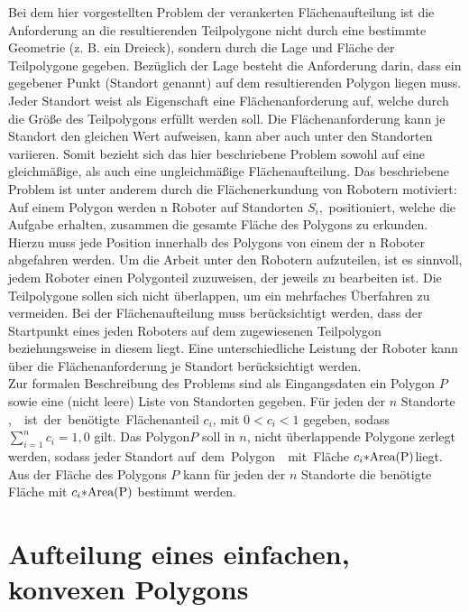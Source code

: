 \documentclass[ngerman]{seminarbeitrag}
\begin{document}
Bei dem hier vorgestellten Problem der verankerten Flächenaufteilung ist die Anforderung an die resultierenden Teilpolygone nicht durch eine bestimmte Geometrie
(z. B. ein Dreieck), sondern durch die Lage und Fläche der Teilpolygone gegeben. Bezüglich der Lage besteht die Anforderung darin, dass ein gegebener Punkt (Standort genannt) auf
dem resultierenden Polygon liegen muss. Jeder Standort weist als Eigenschaft eine Flächenanforderung auf, welche durch die Größe des Teilpolygons erfüllt werden soll. Die
Flächenanforderung kann je Standort den gleichen Wert aufweisen, kann aber auch unter den Standorten variieren. Somit bezieht sich das hier beschriebene Problem sowohl auf eine
gleichmäßige, als auch eine ungleichmäßige Flächenaufteilung. Das beschriebene Problem ist unter anderem durch die Flächenerkundung von Robotern motiviert: \\

Auf einem Polygon werden n Roboter auf Standorten $S_{i},$ \iton positioniert, welche die Aufgabe erhalten, zusammen die gesamte Fläche des Polygons zu
erkunden. Hierzu muss jede Position innerhalb des Polygons von einem der n Roboter abgefahren werden. Um die Arbeit unter den Robotern aufzuteilen, ist es sinnvoll, jedem Roboter einen
Polygonteil zuzuweisen, der jeweils zu bearbeiten ist. Die Teilpolygone sollen sich nicht überlappen, um ein mehrfaches Überfahren zu vermeiden. Bei der Flächenaufteilung muss
berücksichtigt werden, dass der Startpunkt eines jeden Roboters auf dem zugewiesenen Teilpolygon beziehungsweise in diesem liegt. Eine unterschiedliche Leistung der Roboter kann über die
Flächenanforderung je Standort berücksichtigt werden. \\

Zur formalen Beschreibung des Problems sind als Eingangsdaten ein Polygon $P$ sowie eine (nicht leere) Liste von Standorten  gegeben. Für jeden der $n$
Standorte \si, \iton ist der benötigte Flächenanteil $c_{i}$, \iton mit $0 < c_{i} < 1$ gegeben, sodass $\sum_{i=1}^{n}c_{i}=1,0$ gilt. Das Polygon$P$ soll in $n$, nicht
überlappende Polygone zerlegt werden, sodass jeder Standort \si auf dem Polygon \pi mit Fläche $c_{i}* \ar{P} $liegt. Aus der Fläche des Polygons $P$ kann für jeden der $n$ Standorte die
benötigte Fläche mit $c_{i}* \ar{P} $ bestimmt werden.


\section{Aufteilung eines einfachen, konvexen Polygons}\label{konvex}
\end{document}
